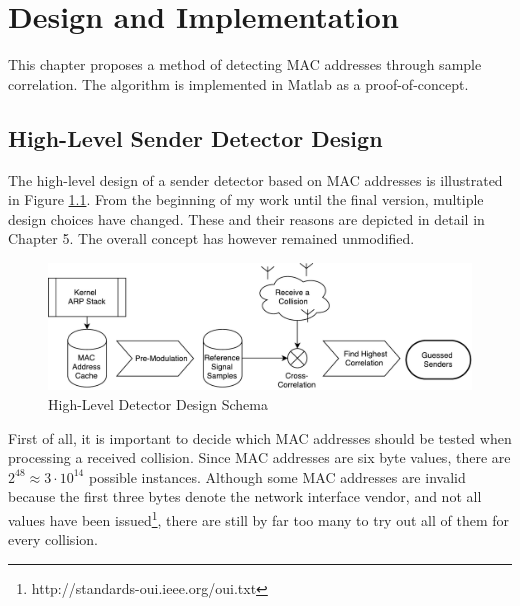 
\chapter{Design and Implementation}\label{ch:design}
\glsresetall %
 

This chapter proposes a method of detecting \gls{MAC} addresses through sample correlation. The algorithm is implemented in Matlab as a proof-of-concept.



\section{High-Level Sender Detector Design}

The high-level design of a sender detector based on \gls{MAC} addresses is illustrated in Figure \ref{fig:blockdesign}. From the beginning of my work until the final version, multiple design choices have changed. These and their reasons are depicted in detail in Chapter 5. The overall concept has however remained unmodified.

\begin{figure}[H]
	\centering
	\includegraphics[width=\textwidth]{gfx/images/detector-block-design}
	\caption[High-Level Detector Design Schema]{High-Level Detector Design Schema}
	\label{fig:blockdesign}
\end{figure}

First of all, it is important to decide which \gls{MAC} addresses should be tested when processing a received collision. Since \gls{MAC} addresses are six byte values, there are $2^{48} \approx 3 \cdot 10^{14}$ possible instances. Although some \gls{MAC} addresses are invalid because the first three bytes denote the network interface vendor, and not all values have been issued\footnote{http://standards-oui.ieee.org/oui.txt}, there are still by far too many to try out all of them for every collision.

